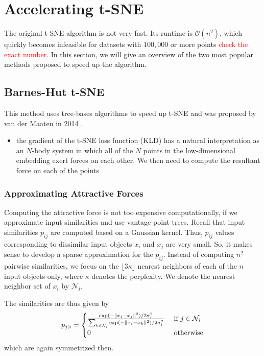 \section{Accelerating t-SNE}

The original t-SNE algorithm is not very fast. Its runtime is $\mathcal{O}(n^2)$, which quickly becomes infeasible for datasets with $100,000$ or more points \textcolor{red}{check the exact number}. In this section, we will give an overview of the two most popular methods proposed to speed up the algorithm. 

\subsection{Barnes-Hut t-SNE}
This method uses tree-bases algorithms to speed up t-SNE and was proposed by van der Maaten in 2014 \cite{vdMaa14}. 

\begin{itemize}
    \item the gradient of the t-SNE loss function (KLD) has a natural interpretation as an $N$-body system in which all of the $N$ points in the low-dimensional embedding exert forces on each other. We then need to compute the resultant force on each of the points
\end{itemize}

\subsubsection{Approximating Attractive Forces}
Computing the attractive force is not too expensive computationally, if we approximate input similarities and use vantage-point trees. Recall that input similarities $p_{ij}$ are computed based on a Gaussian kernel. 
Thus, $p_{ij}$ values corresponding to dissimilar input objects $x_i$ and $x_j$ are very small. 
So, it makes sense to develop a sparse approximation for the $p_{ij}$. Instead of computing $n^2$ pairwise similarities, we focus on the $\lfloor 3 \kappa \rfloor$ nearest neighbors of each of the $n$ input objects only, where $\kappa$ denotes the perplexity. We denote the nearest neighbor set of $x_i$ by $\mathcal{N}_i$. 

The similarities are thus given by 
\begin{equation}
    p_{j|i} = \begin{cases}
    \frac{\exp(-\lVert x_i - x_j\rVert^2) / 2 \sigma_i^2}{\sum_{k \in \mathcal{N}_i} \exp(-\lVert x_i - x_k\rVert^2) / 2 \sigma_i^2} & \text{ if } j \in \mathcal{N}_i \\
    0  & \text{ otherwise}
    \end{cases}
\end{equation}
which are again symmetrized then. 

